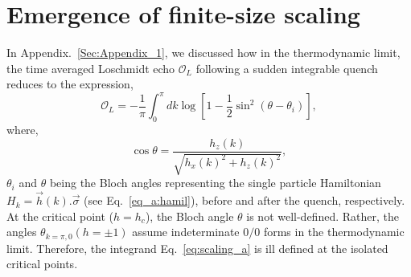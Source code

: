 \documentclass[aps,prx,twocolumn]{revtex4-2}
\begin{document}
{{\section{Emergence of finite-size scaling}
\label{Sec:A2}
In Appendix.~\ref{Sec:Appendix_1}, we discussed how in the thermodynamic limit, the time averaged Loschmidt echo $\mathcal{O}_L$ following a sudden integrable quench reduces to the expression,
\begin{equation}\label{eq:scaling_a}
		\mathcal{O}_L=-\frac{1}{\pi}\int_0^\pi dk\log{\left[1-\frac{1}{2}\sin^2{(\theta-\theta_i)}\right]},
\end{equation}
where,
\begin{equation}
	\cos{\theta}=\frac{h_z(k)}{\sqrt{h_x(k)^2+h_z(k)^2}},
\end{equation}
$\theta_i$ and $\theta$ being the Bloch angles representing the single particle Hamiltonian $H_k=\vec{h}(k).\vec{\sigma}$ (see Eq.~\eqref{eq_a:hamil}), before and after the quench, respectively. At the critical point ($h=h_c$), the Bloch angle $\theta$ is not well-defined. Rather, the angles $\theta_{k=\pi,0}(h=\pm 1)$ assume indeterminate $0/0$ forms in the thermodynamic limit. Therefore, the integrand Eq.~\eqref{eq:scaling_a} is ill defined at the isolated critical points.\\
\begin{figure*}
	\hspace{1cm}
	

\end{figure*}}}
\end{document}
